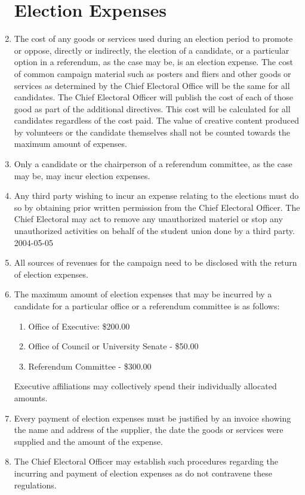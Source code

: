 \documentclass[oneside]{book}
\begin{document}
\begin{enumerate}
\section{\label{Election_Expenses}Election Expenses }
\item The cost of any goods or services used during an election period to
promote or oppose, directly or indirectly, the election of a candidate,
or a particular option in a referendum, as the case may be, is an
election expense. The cost of common campaign material such as posters
and fliers and other goods or services as determined by the Chief
Electoral Office will be the same for all candidates. The Chief Electoral
Officer will publish the cost of each of those good as part of the
additional directives. This cost will be calculated for all candidates
regardless of the cost paid. The value of creative content produced
by volunteers or the candidate themselves shall not be counted towards
the maximum amount of expenses. 
\item Only a candidate or the chairperson of a referendum committee, as
the case may be, may incur election expenses. 
\item Any third party wishing to incur an expense relating to the elections
must do so by obtaining prior written permission from the Chief Electoral
Officer. The Chief Electoral may act to remove any unauthorized materiel
or stop any unauthorized activities on behalf of the student union
done by a third party. 2004-05-05 
\item All sources of revenues for the campaign need to be disclosed with
the return of election expenses. 
\item \label{max-election-expenses}The maximum amount of election expenses
that may be incurred by a candidate for a particular office or a referendum
committee is as follows: 

\begin{enumerate}
\item Office of Executive: \$200.00 
\item Office of Council or University Senate - \$50.00 
\item Referendum Committee - \$300.00 \\
\end{enumerate}
Executive affiliations may collectively spend their individually
allocated amounts. 

\item Every payment of election expenses must be justified by an invoice
showing the name and address of the supplier, the date the goods or
services were supplied and the amount of the expense. 
\item The Chief Electoral Officer may establish such procedures regarding
the incurring and payment of election expenses as do not contravene
these regulations. 


\end{enumerate}
\end{document}
